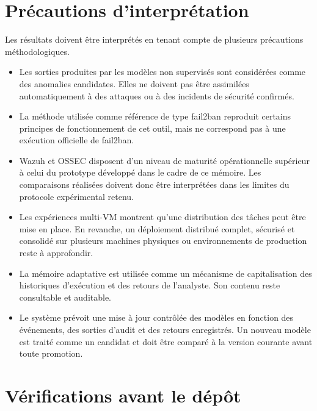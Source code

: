 \section{Précautions d'interprétation}

Les résultats doivent être interprétés en tenant compte de plusieurs précautions méthodologiques.

\begin{itemize}

\item Les sorties produites par les modèles non supervisés sont considérées comme des anomalies candidates. Elles ne doivent pas être assimilées automatiquement à des attaques ou à des incidents de sécurité confirmés.

\item La méthode utilisée comme référence de type fail2ban reproduit certains principes de fonctionnement de cet outil, mais ne correspond pas à une exécution officielle de fail2ban.

\item Wazuh et OSSEC disposent d'un niveau de maturité opérationnelle supérieur à celui du prototype développé dans le cadre de ce mémoire. Les comparaisons réalisées doivent donc être interprétées dans les limites du protocole expérimental retenu.

\item Les expériences multi-VM montrent qu'une distribution des tâches peut être mise en place. En revanche, un déploiement distribué complet, sécurisé et consolidé sur plusieurs machines physiques ou environnements de production reste à approfondir.

\item La mémoire adaptative est utilisée comme un mécanisme de capitalisation des historiques d'exécution et des retours de l'analyste. Son contenu reste consultable et auditable.

\item Le système prévoit une mise à jour contrôlée des modèles en fonction des événements, des sorties d'audit et des retours enregistrés. Un nouveau modèle est traité comme un candidat et doit être comparé à la version courante avant toute promotion.

\end{itemize}


\section{Vérifications avant le dépôt}

